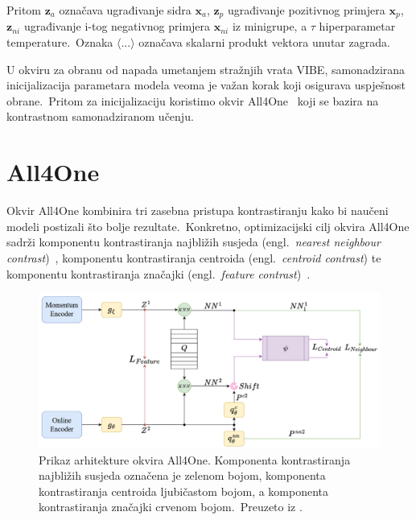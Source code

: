 \documentclass[diplomskirad]{fer}
\begin{document}
Pritom $\bm{z}_{a}$ označava ugrađivanje sidra $\bm{x}_{a}$, $\bm{z}_{p}$ ugrađivanje pozitivnog primjera $\bm{x}_{p}$, $\bm{z}_{ni}$ ugrađivanje i-tog negativnog primjera $\bm{x}_{ni}$ iz minigrupe, a $\tau$ hiperparametar temperature.\ 
Oznaka $\langle ... \rangle$ označava skalarni produkt vektora unutar zagrada.\
  
U okviru za obranu od napada umetanjem stražnjih vrata VIBE, samonadzirana inicijalizacija parametara modela veoma je važan korak koji osigurava uspješnost obrane.\ 
Pritom za inicijalizaciju koristimo okvir All4One~\cite{estepa2023all4one} koji se bazira na kontrastnom samonadziranom učenju.\

\section{All4One}
\label{sek:all4one}

Okvir All4One kombinira tri zasebna pristupa kontrastiranju kako bi naučeni modeli postizali što bolje rezultate.\ 
Konkretno, optimizacijski cilj okvira All4One sadrži komponentu kontrastiranja najbližih susjeda (engl.\ \textit{nearest neighbour contrast})~\cite{dwibedi2021little}, komponentu kontrastiranja centroida (engl.\ \textit{centroid contrast}) te komponentu kontrastiranja značajki (engl.\ \textit{feature contrast})~\cite{zbontar2021barlow}.\ 

\begin{figure}[h]
  \centering
  \includegraphics[scale=0.7]{./Slike/all4one.png}
  \caption{Prikaz arhitekture okvira All4One. Komponenta kontrastiranja najbližih susjeda označena je zelenom bojom, komponenta kontrastiranja centroida ljubičastom bojom, a komponenta kontrastiranja značajki crvenom bojom.\ Preuzeto iz \cite{estepa2023all4one}.}
  \label{fig:all4one}
\end{figure}

\pagebreak
\end{document}
